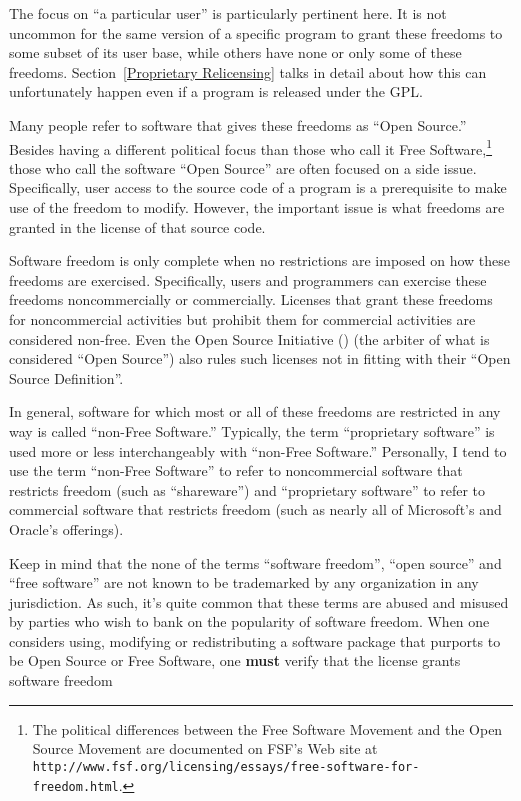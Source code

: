 The focus on ``a particular user'' is particularly pertinent here.  It is not
uncommon for the same version of a specific program to grant these freedoms
to some subset of its user base, while others have none or only some of these
freedoms.  Section~\ref{Proprietary Relicensing} talks in detail about how
this can unfortunately happen even if a program is released under the GPL\@.

Many people refer to software that gives these freedoms as ``Open Source.''
Besides having a different political focus than those who call it Free
Software,\footnote{The political differences between the Free Software
  Movement and the Open Source Movement are documented on FSF's Web site at
  {\tt http://www.fsf.org/licensing/essays/free-software-for-freedom.html}.}
those who call the software ``Open Source'' are often focused on a side
issue.  Specifically, user access to the source code of a program is a
prerequisite to make use of the freedom to modify.  However, the important
issue is what freedoms are granted in the license of that source code.

Software freedom is only complete when no restrictions are imposed on how
these freedoms are exercised.  Specifically, users and programmers can
exercise these freedoms noncommercially or commercially.  Licenses that grant
these freedoms for noncommercial activities but prohibit them for commercial
activities are considered non-free.  Even the Open Source Initiative
() (the arbiter of what is considered ``Open Source'') also rules
such licenses not in fitting with their ``Open Source Definition''.

In general, software for which most or all of these freedoms are
restricted in any way is called ``non-Free Software.''  Typically, the
term ``proprietary software'' is used more or less interchangeably with
``non-Free Software.''  Personally, I tend to use the term ``non-Free
Software'' to refer to noncommercial software that restricts freedom
(such as ``shareware'') and ``proprietary software'' to refer to
commercial software that restricts freedom (such as nearly all of
Microsoft's and Oracle's offerings).

Keep in mind that the none of the terms ``software freedom'', ``open source''
and ``free software'' are not known to be trademarked by any organization in
any jurisdiction.  As such, it's quite common that these terms are abused and
misused by parties who wish to bank on the popularity of software freedom.
When one considers using, modifying or redistributing a software package that
purports to be Open Source or Free Software, one \textbf{must} verify that
the license grants software freedom


